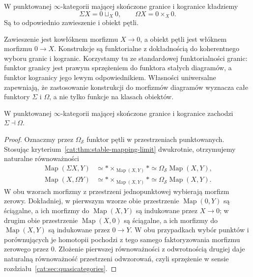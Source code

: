 \begin{definicja}\label{cat:def:stable-suspension-loop}
W punktowanej $\infty$-kategorii mającej skończone granice i kogranice kładziemy
\[
 \Sigma X=0\sqcup_X0,\qquad
 \Omega X=0\times_X0.
\]
Są to odpowiednio zawieszenie i obiekt pętli.
\end{definicja}
Zawieszenie jest kowłóknem morfizmu $X\to0$, a obiekt pętli jest włóknem morfizmu $0\to X$. Konstrukcje są funktorialne z dokładnością do koherentnego wyboru granic i kogranic. Korzystamy tu ze standardowej funktorialności granic: funktor granicy jest prawym sprzężeniem do funktora stałych diagramów, a funktor kogranicy jego lewym odpowiednikiem. Własności uniwersalne zapewniają, że zastosowanie konstrukcji do morfizmów diagramów wyznacza całe funktory $\Sigma$ i $\Omega$, a nie tylko funkcje na klasach obiektów.

\begin{stwierdzenie}\label{cat:prop:stable-suspension-loop-adjunction}
W punktowanej $\infty$-kategorii mającej skończone granice i kogranice zachodzi $\Sigma\dashv\Omega$.
\end{stwierdzenie}
\begin{proof}
Oznaczmy przez $\Omega_{\mathcal S}$ funktor pętli w przestrzeniach punktowanych. Stosując kryterium~\ref{cat:thm:stable-mapping-limit} dwukrotnie, otrzymujemy naturalne równoważności
\[
\begin{aligned}
 \operatorname{Map}(\Sigma X,Y)
 &\simeq *\times_{\operatorname{Map}(X,Y)}*
 \simeq\Omega_{\mathcal S}\operatorname{Map}(X,Y),\\
 \operatorname{Map}(X,\Omega Y)
 &\simeq *\times_{\operatorname{Map}(X,Y)}*
 \simeq\Omega_{\mathcal S}\operatorname{Map}(X,Y).
\end{aligned}
\]
W obu wzorach morfizmy z przestrzeni jednopunktowej wybierają morfizm zerowy. Dokładniej, w pierwszym wzorze obie przestrzenie $\operatorname{Map}(0,Y)$ są ściągalne, a ich morfizmy do $\operatorname{Map}(X,Y)$ są indukowane przez $X\to0$; w drugim obie przestrzenie $\operatorname{Map}(X,0)$ są ściągalne, a ich morfizmy do $\operatorname{Map}(X,Y)$ są indukowane przez $0\to Y$. W obu przypadkach wybór punktów i porównujących je homotopii pochodzi z tego samego faktoryzowania morfizmu zerowego przez $0$. Złożenie pierwszej równoważności z odwrotnością drugiej daje naturalną równoważność przestrzeni odwzorowań, czyli sprzężenie w sensie rozdziału~\ref{cat:sec:quasicategories}.
\end{proof}

